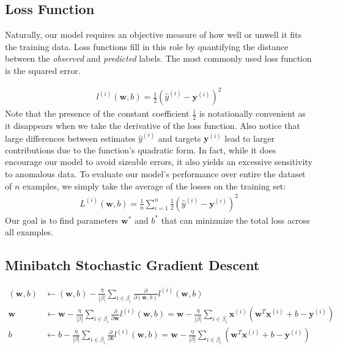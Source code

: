 \documentclass[a4paper,12pt]{article}
\theoremstyle{definition}
\begin{document}
\subsection*{Loss Function}
Naturally, our model requires an objective measure of how well or unwell it fits the training data.
Loss functions fill in this role by quantifying the distance between the \textit{observed} and \textit{predicted}
labels. The most commonly used loss function is the squared error.

\begin{align*}
    l^{(i)}(\mathbf{w},b) = \frac{1}{2}(\hat{y}^{(i)}-\mathbf{y}^{(i)})^2
\end{align*}
Note that the presence of the constant coefficient $\frac{1}{2}$ is notationally convenient as it disappears when we
take the derivative of the loss function. Also notice that large differences between estimates $\hat{y}^{(i)}$
and targets $\mathbf{y}^{(i)}$ lead to larger contributions due to the function's quadratic form. In fact, while
it does encourage our model to avoid sizeable errors, it also yields an excessive sensitivity to anomalous data.
To evaluate our model's performance over entire the dataset of $n$ examples, we simply take the average of
the losses on the training set:
\begin{align*}
    L^{(i)}(\mathbf{w},b) = \frac{1}{n}\sum_{i=1}^{n}\frac{1}{2}(\hat{y}^{(i)}-\mathbf{y}^{(i)})^2
\end{align*}
Our goal is to find parameters $\mathbf{w}^*$ and $b^*$ that can minizmize the total loss across all examples.

\subsection*{Minibatch Stochastic Gradient Descent}

\begin{align*}
    (\mathbf{w},b) & \leftarrow (\mathbf{w},b) - \frac{\eta}{|\beta|}\sum_{i\in\beta_i}\frac{\partial}{\partial(\mathbf{w},b)}l^{(i)}(\mathbf{w},b)                                                                                                                   \\
    \mathbf{w}     & \leftarrow \mathbf{w} - \frac{\eta}{|\beta|}\sum_{i\in\beta_i}\frac{\partial}{\partial\mathbf{w}}l^{(i)}(\mathbf{w},b) = \mathbf{w}- \frac{\eta}{|\beta|}\sum_{i\in\beta_i}\mathbf{x}^{(i)}(\mathbf{w}^T\mathbf{x}^{(i)} + b - \mathbf{y}^{(i)}) \\
    b              & \leftarrow b - \frac{\eta}{|\beta|}\sum_{i\in\beta_i}\frac{\partial}{\partial b}l^{(i)}(\mathbf{w},b) = \mathbf{w}- \frac{\eta}{|\beta|}\sum_{i\in\beta_i}(\mathbf{w}^T\mathbf{x}^{(i)} + b - \mathbf{y}^{(i)})
\end{align*}
\end{document}

